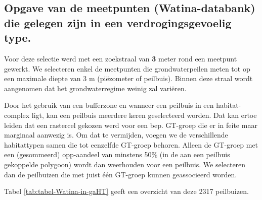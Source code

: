\documentclass[11pt,]{book}
\begin{document}
\subsection{Opgave van de meetpunten (Watina-databank) die gelegen zijn
in een verdrogingsgevoelig
type.}\label{opgave-van-de-meetpunten-watina-databank-die-gelegen-zijn-in-een-verdrogingsgevoelig-type.}

Voor deze selectie werd met een zoekstraal van \textbf{3} meter rond een
meetpunt gewerkt. We selecteren enkel de meetpunten die grondwaterpeilen
meten tot op een maximale diepte van 3 m (piëzometer of peilbuis).
Binnen deze straal wordt aangenomen dat het grondwaterregime weinig zal
variëren.

Door het gebruik van een bufferzone en wanneer een peilbuis in een
habitat-complex ligt, kan een peilbuis meerdere keren geselecteerd
worden. Dat kan ertoe leiden dat een rastercel gekozen werd voor een
bep. GT-groep die er in feite maar marginaal aanwezig is. Om dat te
vermijden, voegen we de verschillende habitattypen samen die tot
eenzelfde GT-groep behoren. Alleen de GT-groep met een (gesommeerd)
opp-aandeel van minstens 50\% (in de aan een peilbuis gekoppelde
polygoon) wordt dan weerhouden voor een peilbuis. We selecteren dan de
peilbuizen die met juist één GT-groep kunnen geassocieerd worden.

Tabel \ref{tab:tabel-Watina-in-gaHT} geeft een overzicht van deze 2317
peilbuizen.
\end{document}
